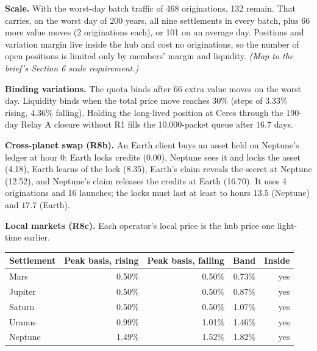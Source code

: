 \documentclass[11pt]{article}
\theoremstyle{definition}
\theoremstyle{remark}
\begin{document}
\textbf{Scale.} With the worst-day batch traffic of 468 originations, 132 remain. That carries, on the worst day of 200 years, all nine settlements in every batch, plus 66 more value moves (2 originations each), or 101 on an average day. Positions and variation margin live inside the hub and cost no originations, so the number of open positions is limited only by members' margin and liquidity. \emph{(Map to the brief's Section 6 scale requirement.)}

\textbf{Binding variations.} The quota binds after 66 extra value moves on the worst day. Liquidity binds when the total price move reaches $30\%$ (steps of $3.33\%$ rising, $4.36\%$ falling). Holding the long-lived position at Ceres through the 190-day Relay A closure without R1 fills the 10{,}000-packet queue after $16.7$ days.



\textbf{Cross-planet swap (R8b).} An Earth client buys an asset held on Neptune's ledger at hour 0: Earth locks credits (0.00), Neptune sees it and locks the asset (4.18), Earth learns of the lock (8.35), Earth's claim reveals the secret at Neptune (12.52), and Neptune's claim releases the credits at Earth (16.70). It uses 4 originations and 16 launches; the locks must last at least to hours $13.5$ (Neptune) and $17.7$ (Earth).

\textbf{Local markets (R8c).} Each operator's local price is the hub price one light-time earlier.
\begin{table}[H]
\centering
\small
\begin{tabular}{@{}lrrrr@{}}
\toprule
Settlement & Peak basis, rising & Peak basis, falling & Band & Inside \\
\midrule
Mars & 0.50\% & 0.50\% & 0.73\% & yes \\
Jupiter & 0.50\% & 0.50\% & 0.87\% & yes \\
Saturn & 0.50\% & 0.50\% & 1.07\% & yes \\
Uranus & 0.99\% & 1.01\% & 1.46\% & yes \\
Neptune & 1.49\% & 1.52\% & 1.82\% & yes \\
\bottomrule
\end{tabular}
\end{table}
\end{document}
